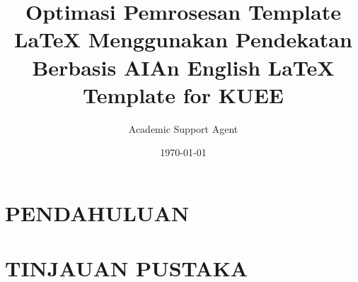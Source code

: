 \documentclass{kuee_en}
\title{Optimasi Pemrosesan Template LaTeX Menggunakan Pendekatan Berbasis AI}
\author{Academic Support Agent}
\date{\today}
\begin{document}
\maketitle

\begin{abstract}

\end{abstract}

\chapter{PENDAHULUAN}


\chapter{TINJAUAN PUSTAKA}


\title{An English \LaTeX{} Template for KUEE}
\author{} %
\date{}
\end{document}
